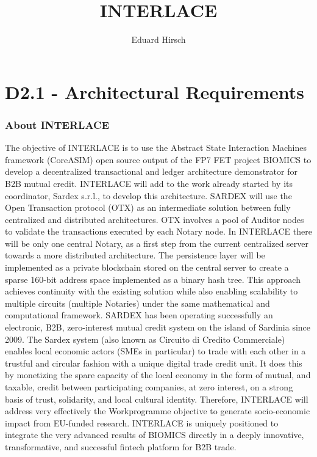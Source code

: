 \documentclass[]{article}
\title{INTERLACE}
\begin{document}
\date{}
\author{Eduard Hirsch}
\maketitle
\part{D2.1 - Architectural Requirements}
\section{\textbf{About INTERLACE}}

The objective of INTERLACE is to use the Abstract State Interaction Machines framework (CoreASIM) open source output of
the FP7 FET project BIOMICS to develop a decentralized transactional and ledger architecture demonstrator for B2B mutual
credit. INTERLACE will add to the work already started by its coordinator, Sardex s.r.l., to develop this architecture.
SARDEX will use the Open Transaction protocol (OTX) as an intermediate solution between fully centralized and distributed
architectures. OTX involves a pool of Auditor nodes to validate the transactions executed by each Notary node. In
INTERLACE there will be only one central Notary, as a first step from the current centralized server towards a more
distributed architecture. The persistence layer will be implemented as a private blockchain stored on the central server to
create a sparse 160-bit address space implemented as a binary hash tree. This approach achieves continuity with the
existing solution while also enabling scalability to multiple circuits (multiple Notaries) under the same mathematical and
computational framework. SARDEX has been operating successfully an electronic, B2B, zero-interest mutual credit system
on the island of Sardinia since 2009. The Sardex system (also known as Circuito di Credito Commerciale) enables local
economic actors (SMEs in particular) to trade with each other in a trustful and circular fashion with a unique digital trade
credit unit. It does this by monetizing the spare capacity of the local economy in the form of mutual, and taxable, credit
between participating companies, at zero interest, on a strong basis of trust, solidarity, and local cultural identity. Therefore,
INTERLACE will address very effectively the Workprogramme objective to generate socio-economic impact from EU-funded
research. INTERLACE is uniquely positioned to integrate the very advanced results of BIOMICS directly in a deeply
innovative, transformative, and successful fintech platform for B2B trade.
\end{document}
